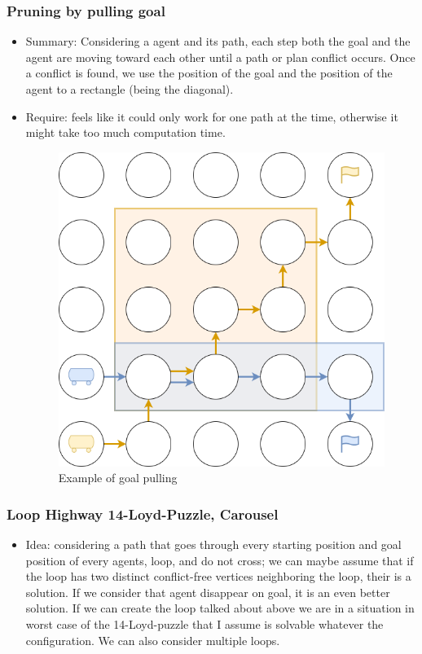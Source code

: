 \subsubsection{Pruning by pulling goal}
\begin{itemize}
  \item Summary: Considering a agent and its path, each step both the goal and the agent are moving toward each other until a path or plan conflict occurs. Once a conflict is found, we use the position of the goal and the position of the agent to a rectangle (being the diagonal).
  \item Require: feels like it could only work for one path at the time, otherwise it might take too much computation time. 
  \begin{figure}[H]
    \centering
    \caption{Example of goal pulling}\label{img:pulling_goal}
    \includegraphics[width=\widthimg]{img/puling_goal.drawio.png}
  \end{figure}
\end{itemize}

\subsubsection{Loop Highway 14-Loyd-Puzzle, Carousel}
\begin{itemize}
  \item Idea: considering a path that goes through every starting position and goal position of every agents, loop, and do not cross; we can maybe assume that if the loop has two distinct conflict-free vertices neighboring the loop, their is a solution. If we consider that agent disappear on goal, it is an even better solution. If we can create the loop talked about above we are in a situation in worst case of the 14-Loyd-puzzle that I assume is solvable whatever the configuration. We can also consider multiple loops.
\end{itemize}

